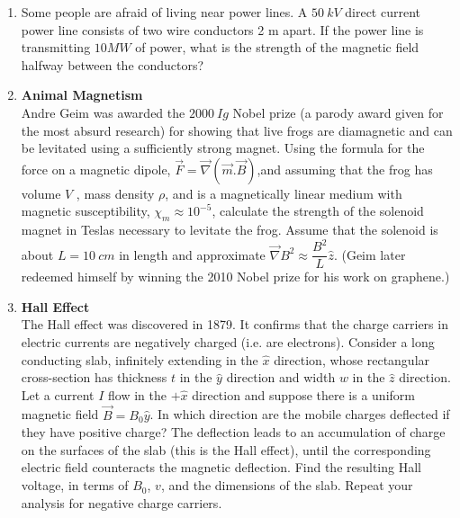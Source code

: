 \documentclass[fleqn]{article}
\begin{document}
  \begin{enumerate}
    \item Some people are afraid of living near power lines.  A $50 ~ kV$ direct current power line consists of two wire conductors 2 m apart. If the
    power line is transmitting $10 MW$ of power, what is the strength of the
    magnetic field halfway between the conductors?


    \item \textbf{Animal Magnetism}
    \\
    Andre Geim was awarded the $2000 ~ Ig$ Nobel prize (a parody award given for the most absurd research) for showing that live frogs are
    diamagnetic and can be levitated using a sufficiently strong magnet. Using the formula for the force on a magnetic dipole, 
    $\overrightarrow{F}=\overrightarrow{\nabla} \left(
      \overrightarrow{m}.\overrightarrow{B}
    \right)$,and assuming that the frog has volume $V$ , mass density $\rho$, and is a magnetically linear medium with 
    magnetic susceptibility, $\chi_m \approx 10^{-5}$, calculate the strength of the solenoid magnet in Teslas necessary to
    levitate the frog. Assume that the solenoid is about $L=10 ~ cm$ in
    length and approximate $\overrightarrow{\nabla} B^2 \approx \dfrac{B^2}{L} \hat{z}$. (Geim later redeemed himself
    by winning the 2010 Nobel prize for his work on graphene.)


    \item \textbf{Hall Effect}
    \\
    The Hall effect was discovered in 1879. It confirms that the charge carriers in electric currents are negatively charged (i.e. are electrons).
    Consider a long conducting slab, infinitely extending in the $\hat{x}$ direction, whose rectangular cross-section has thickness $t$ in 
    the $\hat{y}$ direction and width $w$ in the $\hat{z}$ direction. Let a current $I$ flow in the $+\hat{x}$ direction
    and suppose there is a uniform magnetic field $\overrightarrow{B}=B_0 \hat{y}$. In which direction are the mobile charges deflected if they 
    have positive charge? The deflection leads to an accumulation of charge on the surfaces of the slab (this is the Hall effect), until the 
    corresponding electric field counteracts the magnetic deflection. Find the resulting Hall voltage, in terms of $B_0$, $v$, and the dimensions
    of the slab. Repeat your analysis for negative charge carriers.


\end{enumerate}
\end{document}
